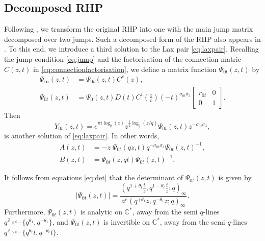 \documentclass[a4paper,reqno,11pt]{amsart}
\numberwithin{equation}{section}
\numberwithin{figure}{section}
\theoremstyle{plain}
\theoremstyle{remark}
\numberwithin{rhp}{section}
\begin{document}
\subsection{Decomposed RHP} Following \cite{roffelsen2024segre}, we transform the original RHP into one with the main jump matrix decomposed over two jumps. Such a decomposed form of the RHP also appears in \cite[\S 3.1]{JNS2017}.
To this end, we introduce a third solution to the Lax pair \eqref{eq:laxpair}. Recalling the jump condition \eqref{eq:jump} and the factorisation of the connection matric $C(z,t)$ in \eqref{eq:connectionfactorisation}, we define a matrix function $\Psi_{0t}(z,t)$ by
\begin{equation}\label{eq:jump_split}
  \begin{aligned}
    \Psi_\infty(z,t)&=\Psi_{0t}(z,t)C^e(z),\\
    \Psi_{0t}(z,t)&=\Psi_{0}(z,t)D(t)C^i\left(\frac{z}{t}\right)(-t)^{\sigma_{0t} \sigma_3} \begin{bmatrix}r_{0t} & 0\\
    0 & 1\end{bmatrix}.
\end{aligned}  
\end{equation}
 Then
 \begin{equation*}
     Y_{0t}(z,t)=e^{\pi i\log_q(z)}z^{\frac{1}{2}\log_q(z/q)}\Psi_{0t}(z,t)z^{-\sigma_{0t}\sigma_3},
 \end{equation*}
is another solution of \eqref{eq:laxpair}. In other words,
\begin{align*}
    A(z,t)&=-z\;\Psi_{0t}(qz,t)q^{-\sigma_{0t}\sigma_3}\Psi_{0t}(z,t)^{-1},\\
    B(z,t)&=\Psi_{0t}(z,qt)\Psi_{0t}(z,t)^{-1}.
\end{align*}

It follows from equations \eqref{eq:det} that the determinant of $\Psi_{0t}(z,t)$ is given by
\begin{equation*}
    |\Psi_{0t}(z,t)|=\frac{\left(q^{1+\theta_t}\frac{t}{z},q^{1-\theta_t}\frac{t}{z};q\right)_\infty}{a^e\left(q^{+\theta_1}z,q^{-\theta_1}z;q\right)_\infty}.
\end{equation*}
Furthermore, $\Psi_{0t}(z,t)$ is analytic on $\mathbb{C}^*$, away from the semi $q$-lines $q^{\mathbb{Z}_{\leq 0}}\cdot \{q^{\theta_1},q^{-\theta_1}\}$, and $\Psi_{0t}(z,t)$ is invertible on $\mathbb{C}^*$, away from the semi $q$-lines $q^{\mathbb{Z}_{>0}}\cdot \{q^{\theta_t}t,q^{-\theta_t}t\}$.
\end{document}
